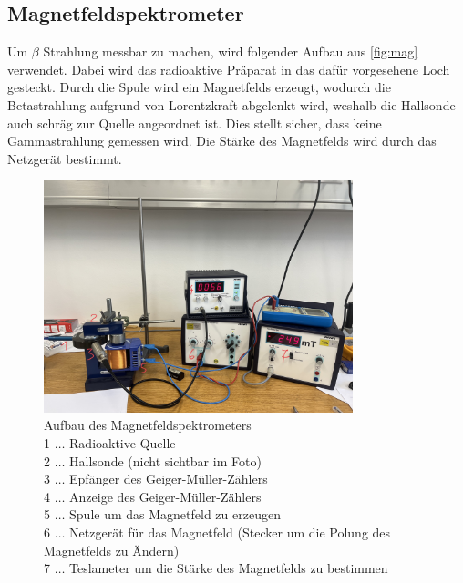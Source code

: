\documentclass[12pt,english,ngerman]{scrartcl}
\begin{document}
\subsection{Magnetfeldspektrometer}\label{sec:aufbau_Magnetfeldspektrometer}

Um \(\beta\) Strahlung messbar zu machen, wird folgender Aufbau aus
\autoref{fig:mag} verwendet. Dabei wird das radioaktive Präparat in das dafür
vorgesehene Loch gesteckt. Durch die Spule wird ein Magnetfelds erzeugt,
wodurch die Betastrahlung aufgrund von Lorentzkraft abgelenkt wird, weshalb die
Hallsonde auch schräg zur Quelle angeordnet ist. Dies stellt sicher, dass keine
Gammastrahlung gemessen wird. Die Stärke des Magnetfelds wird durch das
Netzgerät bestimmt.


\begin{figure}[H]
    \begin{center}
    \includegraphics[width = 0.8\textwidth]{./figures/mag_new.png}
      \end{center}
      \caption[Aufbau des Magnetfeldspektrometers]{Aufbau des Magnetfeldspektrometers \\
        1 \(\dots\) Radioaktive Quelle \\
        2 \(\dots\) Hallsonde (nicht sichtbar im Foto) \\
        3 \(\dots\) Epfänger des Geiger-Müller-Zählers \\
        4 \(\dots\) Anzeige des Geiger-Müller-Zählers \\
        5 \(\dots\) Spule um das Magnetfeld zu erzeugen \\
        6 \(\dots\) Netzgerät für das Magnetfeld (Stecker um die Polung des Magnetfelds zu Ändern) \\
        7 \(\dots\) Teslameter um die Stärke des Magnetfelds zu bestimmen}
      \label{fig:mag}

  \end{figure}
\end{document}
